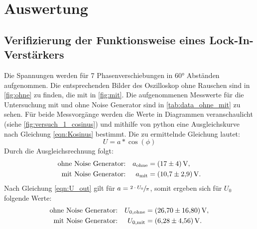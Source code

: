 \section{Auswertung}
\label{sec:Auswertung}

\subsection{Verifizierung der Funktionsweise eines Lock-In-Verstärkers}
\label{subsec:Verifizierung}
Die Spannungen werden für 7 Phasenverschiebungen in 60° Abständen aufgenommen.
Die entsprechenden Bilder des Oszilloskop ohne Rauschen sind in \autoref{fig:ohne} zu finden, die mit in \autoref{fig:mit}.
Die aufgenommenen Messwerte für die Untersuchung mit und ohne Noise Generator sind in \autoref{tab:data_ohne_mit} zu sehen.
Für beide Messvorgänge werden die Werte in Diagrammen veranschaulicht (siehe \autoref{fig:versuch_1_cosinus}) und mithilfe von python eine Ausgleichskurve nach Gleichung \eqref{eqn:Kosinus} bestimmt.
Die zu ermittelnde Gleichung lautet:
\begin{equation*}
  U = a * \cos(\phi)
\end{equation*}
Durch die Ausgleichsrechnung folgt:
\begin{align*}
  \text{ohne Noise Generator:}&  &a_\text{ohne} &= \SI{17 \pm 4}{\volt}, \\
  \text{mit Noise Generator:}&   &a_\text{mit}  &= \SI{10.7 \pm 2.9}{\volt}.
\end{align*}
Nach Gleichung \eqref{eqn:U_out} gilt für $a = \sfrac{2 \cdot U_0}{\pi}$, somit ergeben sich für $U_0$ folgende Werte:
\begin{align*}
  \text{ohne Noise Generator:}&  &U_{0,\text{ohne}} &= \SI{26.70 \pm 16.80}{\volt}, \\
  \text{mit Noise Generator:}&   &U_{0,\text{mit}}  &= \SI{ 6.28 \pm 4.56}{\volt}.
\end{align*}


